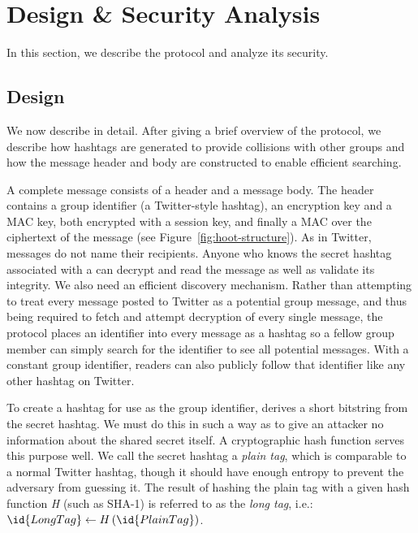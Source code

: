 \section{Design \& Security Analysis}
\label{sec:design-sec}

In this section, we describe the \hoot protocol and analyze its security.

\subsection{Design}
\label{sec:design}

We now describe \hoot in detail. After giving a brief overview of the
\hoot  protocol, we describe how hashtags are generated to provide
collisions with other groups and how the message header and body are
constructed to enable efficient searching.

 A complete \hoot message consists of a 
header and a message body. The header contains a group identifier
(a Twitter-style hashtag), an encryption key and a MAC key, both
encrypted with a session key, and finally a MAC
over the ciphertext of the message (see
Figure~\ref{fig:hoot-structure}). As in
Twitter, messages do not name their recipients. Anyone who knows the
secret hashtag associated with a \hoot can decrypt and read the message
as well as validate its integrity.
We also need an efficient discovery mechanism.
Rather than attempting to treat every message
posted to Twitter as a potential group message, and thus being
required to fetch and attempt decryption of every single message,
the \hoot protocol places an identifier into every \hoot message
as a hashtag so a fellow group member can simply search for the
identifier to see all potential messages. With a constant group
identifier, readers can also publicly follow that identifier like any
other hashtag on Twitter.

 To create a hashtag for use as the group
identifier, \hoot derives a short bitstring from the secret hashtag. We
must do this in such a way as to give an attacker no information about
the shared secret itself. A cryptographic hash function serves this
purpose well.
We call the secret hashtag a \textit{plain tag}, which is comparable to
a normal Twitter hashtag, though it should have enough entropy to
prevent the adversary from guessing it. The result of hashing the plain
tag with a given hash function \textit{H} (such as SHA-1) is referred to
as the \textit{long tag}, i.e.:
%
$\id{LongTag} \leftarrow H\left(\id{PlainTag}\right)$.

